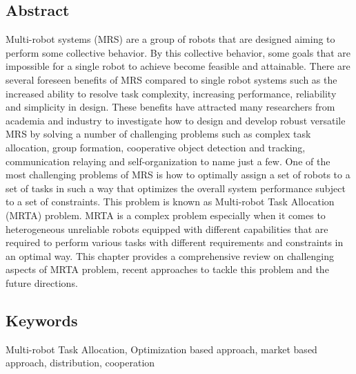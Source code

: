     \subsection*{Abstract}
    Multi-robot systems (MRS) are a group of robots that are designed
    aiming to perform some collective behavior. By this collective behavior, some goals
    that are impossible for a single robot to achieve become feasible and attainable.
    There are several foreseen benefits of MRS compared to single robot systems such
    as the increased ability to resolve task complexity, increasing performance, reliability and simplicity in design. These benefits have attracted many researchers from
    academia and industry to investigate how to design and develop robust versatile MRS
    by solving a number of challenging problems such as complex task allocation, group
    formation, cooperative object detection and tracking, communication relaying and
    self-organization to name just a few. One of the most challenging problems of MRS
    is how to optimally assign a set of robots to a set of tasks in such a way that optimizes
    the overall system performance subject to a set of constraints. This problem is known
    as Multi-robot Task Allocation (MRTA) problem. MRTA is a complex problem
    especially when it comes to heterogeneous unreliable robots equipped with different
    capabilities that are required to perform various tasks with different requirements
    and constraints in an optimal way. This chapter provides a comprehensive review on
    challenging aspects of MRTA problem, recent approaches to tackle this problem and
    the future directions.
    
    \subsection*{Keywords}
    Multi-robot Task Allocation, Optimization based approach, market based approach, distribution, cooperation
    
     
